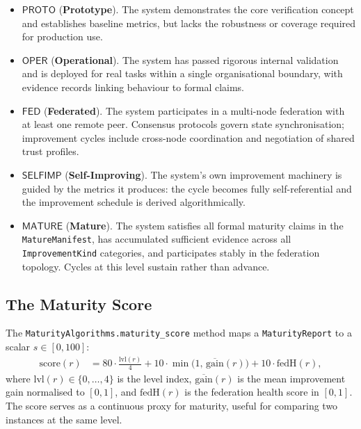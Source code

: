 \documentclass[11pt]{article}
\newcommand{\lvl}{\mathrm{lvl}}             %
\newcommand{\gain}{\mathrm{gain}}           %
\newcommand{\score}{\mathrm{score}}         %
\newcommand{\fedH}{\mathrm{fedH}}           %
\newcommand{\Proto}{\ensuremath{\mathsf{PROTO}}}
\newcommand{\Oper}{\ensuremath{\mathsf{OPER}}}
\newcommand{\Fed}{\ensuremath{\mathsf{FED}}}
\newcommand{\SelfImp}{\ensuremath{\mathsf{SELFIMP}}}
\newcommand{\Matur}{\ensuremath{\mathsf{MATURE}}}
\begin{document}
\begin{itemize}[leftmargin=2em]
  \item $\Proto$ (\textbf{Prototype}).  The system demonstrates the core
    verification concept and establishes baseline metrics, but lacks the
    robustness or coverage required for production use.

  \item $\Oper$ (\textbf{Operational}).  The system has passed rigorous internal
    validation and is deployed for real tasks within a single organisational
    boundary, with evidence records linking behaviour to formal claims.

  \item $\Fed$ (\textbf{Federated}).  The system participates in a multi-node
    federation with at least one remote peer.  Consensus protocols govern state
    synchronisation; improvement cycles include cross-node coordination and
    negotiation of shared trust profiles.

  \item $\SelfImp$ (\textbf{Self-Improving}).  The system's own improvement
    machinery is guided by the metrics it produces: the cycle becomes fully
    self-referential and the improvement schedule is derived algorithmically.

  \item $\Matur$ (\textbf{Mature}).  The system satisfies all formal maturity
    claims in the \texttt{MatureManifest}, has accumulated sufficient evidence
    across all \texttt{ImprovementKind} categories, and participates stably in
    the federation topology.  Cycles at this level sustain rather than advance.
\end{itemize}

\subsection{The Maturity Score}

The \texttt{MaturityAlgorithms.maturity\_score} method maps a
\texttt{MaturityReport} to a scalar $s \in [0, 100]$:
\begin{align}
  \score(r) &= 80 \cdot \frac{\lvl(r)}{4}
              + 10 \cdot \min\!\bigl(1,\, \overline{\gain}(r)\bigr)
              + 10 \cdot \fedH(r), \label{eq:score}
\end{align}
where $\lvl(r) \in \{0,\ldots,4\}$ is the level index, $\overline{\gain}(r)$
is the mean improvement gain normalised to $[0,1]$, and $\fedH(r)$ is the
federation health score in $[0,1]$.  The score serves as a continuous proxy
for maturity, useful for comparing two instances at the same level.
\end{document}
